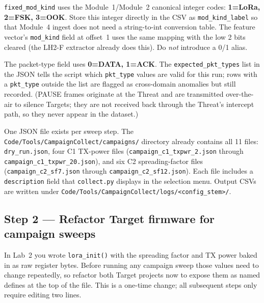 \documentclass[11pt,letterpaper]{article}
\begin{document}
\begin{tcolorbox}[infobox={Modulation-Kind and Packet-Type Canonical Mappings}]
\texttt{fixed\_mod\_kind} uses the Module~1/Module~2 canonical integer codes: \textbf{1=LoRa, 2=FSK, 3=OOK}. Store this integer directly in the \mbox{CSV} as \texttt{mod\_kind\_label} so that Module~4 ingest does not need a string-to-int conversion table. The feature vector's \texttt{mod\_kind} field at offset~1 uses the same mapping with the low 2 bits cleared (the LH2-F extractor already does this). Do \emph{not} introduce a 0/1 alias.

The packet-type field uses \textbf{0=DATA, 1=ACK}. The \texttt{expected\_pkt\_types} list in the JSON tells the script which \texttt{pkt\_type} values are valid for this run; rows with a \texttt{pkt\_type} outside the list are flagged as cross-domain anomalies but still recorded. (PAUSE frames originate at the Threat and are transmitted over-the-air to silence Targets; they are not received back through the Threat's intercept path, so they never appear in the dataset.)
\end{tcolorbox}

One JSON file exists per sweep step. The \texttt{Code/Tools/CampaignCollect/campaigns/} directory already contains all 11 files: \texttt{dry\_run.json}, four C1 TX-power files (\texttt{campaign\_c1\_txpwr\_2.json} through \texttt{campaign\_c1\_txpwr\_20.json}), and six C2 spreading-factor files (\texttt{campaign\_c2\_sf7.json} through \texttt{campaign\_c2\_sf12.json}). Each file includes a \texttt{description} field that \texttt{collect.py} displays in the selection menu. Output CSVs are written under \texttt{Code/Tools/CampaignCollect/logs/<config\_stem>/}.

\newpage
\subsection{Step 2 --- Refactor Target firmware for campaign sweeps}
In Lab~2 you wrote \texttt{lora\_init()} with the spreading factor and TX power baked in as raw register bytes. Before running any campaign sweep those values need to change repeatedly, so refactor both Target projects now to expose them as named defines at the top of the file. This is a one-time change; all subsequent steps only require editing two lines.
\end{document}
